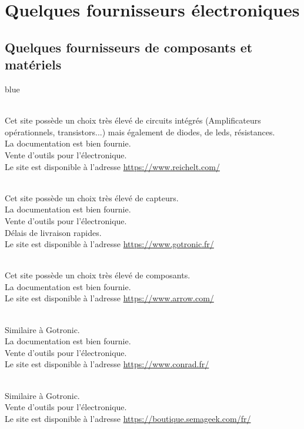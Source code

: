\chapter{Quelques fournisseurs électroniques}

  \section{Quelques fournisseurs de composants et matériels}

  \begin{items}{blue}{\Circle}
    \item {} \\ Cet site possède un choix très élevé de circuits intégrés (Amplificateurs opérationnels, transistors...) mais également de diodes, de leds, résistances.\\
    La documentation est bien fournie.\\
    Vente d'outils pour l'électronique.\\
    Le site est disponible à l'adresse \url{https://www.reichelt.com/}

    \item {} \\ Cet site possède un choix très élevé de capteurs.\\
    La documentation est bien fournie.\\
    Vente d'outils pour l'électronique.\\
    Délais de livraison rapides.\\
    Le site est disponible à l'adresse \url{https://www.gotronic.fr/}

    \item {} \\ Cet site possède un choix très élevé de composants.\\
    La documentation est bien fournie.\\
    Le site est disponible à l'adresse \url{https://www.arrow.com/}

    \item {} \\ Similaire à Gotronic.\\
    La documentation est bien fournie.\\
    Vente d'outils pour l'électronique.\\
    Le site est disponible à l'adresse \url{https://www.conrad.fr/}

    \item {} \\ Similaire à Gotronic.\\
    Vente d'outils pour l'électronique.\\
    Le site est disponible à l'adresse \url{https://boutique.semageek.com/fr/}



\end{items}
